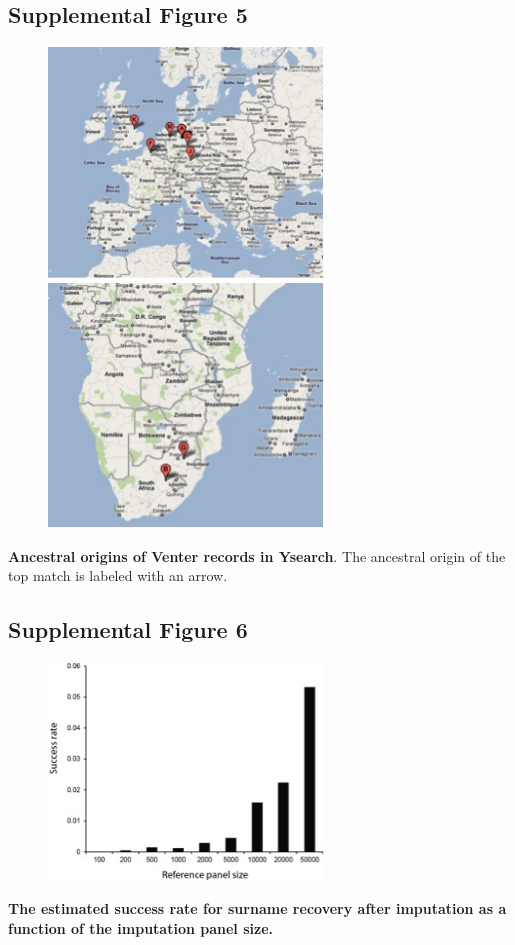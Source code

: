 \subsection{Supplemental Figure 5}
\begin{figure}[h!]
\centering
\label{fig:sursup5}
\includegraphics[width=0.65\textwidth]{Figures/App1/SuppFig5a.jpg}
\includegraphics[width=0.65\textwidth]{Figures/App1/SuppFig5b.jpg}
\end{figure}
\textbf{Ancestral origins of Venter records in Ysearch}. The ancestral origin of the top match is labeled with an arrow.

\pagebreak
\subsection{Supplemental Figure 6}
\begin{figure}[h!]
\centering
\label{fig:sursup6}
\includegraphics[width=0.65\textwidth]{Figures/App1/SuppFig6.jpg}
\end{figure}
\textbf{The estimated success rate for surname recovery after imputation as a function of the imputation panel size.}

